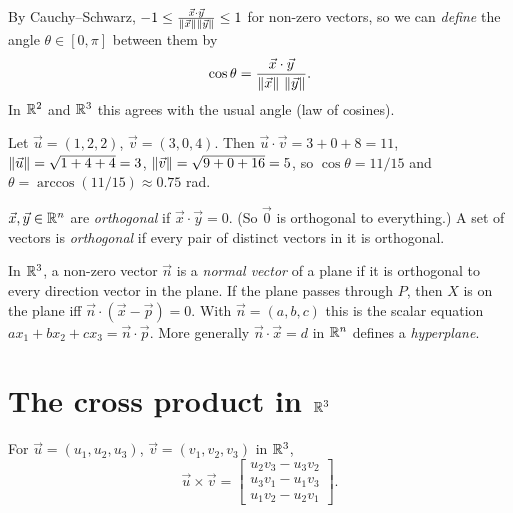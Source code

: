 By Cauchy--Schwarz, $-1\le\frac{\vec x\cdot\vec y}{\left\lVert \vec x \right\rVert\left\lVert \vec y \right\rVert}\le1$ for non-zero
vectors, so we can \emph{define} the angle $\theta\in[0,\pi]$ between them by
\[
  \cos\theta = \frac{\vec x\cdot\vec y}{\left\lVert \vec x \right\rVert\,\left\lVert \vec y \right\rVert}.
\]
In $\mathbb{R}^2$ and $\mathbb{R}^3$ this agrees with the usual angle (law of cosines).

\begin{example}
Let $\vec u=(1,2,2)$, $\vec v=(3,0,4)$. Then $\vec u\cdot\vec v = 3+0+8=11$,
$\left\lVert \vec u \right\rVert=\sqrt{1+4+4}=3$, $\left\lVert \vec v \right\rVert=\sqrt{9+0+16}=5$, so
$\cos\theta = 11/15$ and $\theta = \arccos(11/15)\approx 0.75$ rad.
\end{example}

\begin{definition}[Orthogonal]
$\vec x,\vec y\in\mathbb{R}^n$ are \emph{orthogonal} if $\vec x\cdot\vec y=0$. (So $\vec 0$ is orthogonal
to everything.) A set of vectors is \emph{orthogonal} if every pair of distinct vectors in it is
orthogonal.
\end{definition}

\begin{definition}
In $\mathbb{R}^3$, a non-zero vector $\vec n$ is a \emph{normal vector} of a plane if it is orthogonal to
every direction vector in the plane. If the plane passes through $P$, then $X$ is on the plane
iff $\vec n\cdot(\vec x-\vec p)=0$. With $\vec n=(a,b,c)$ this is the scalar equation
$ax_1+bx_2+cx_3 = \vec n\cdot\vec p$. More generally $\vec n\cdot\vec x = d$ in $\mathbb{R}^n$ defines a
\emph{hyperplane}.
\end{definition}

\section{The cross product in $\mathbb{R}^3$}

\begin{definition}
For $\vec u=(u_1,u_2,u_3)$, $\vec v=(v_1,v_2,v_3)$ in $\mathbb{R}^3$,
\[
  \vec u\times\vec v = \begin{bmatrix} u_2v_3-u_3v_2 \\ u_3v_1-u_1v_3 \\ u_1v_2-u_2v_1\end{bmatrix}.
\]
\end{definition}

